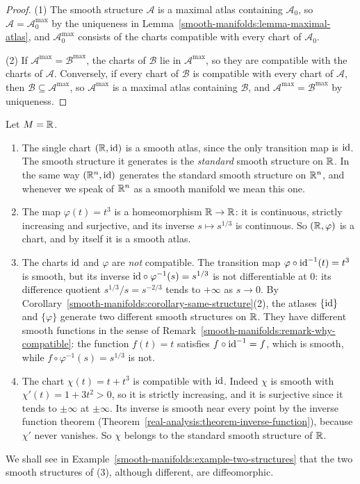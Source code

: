 \begin{proof}
(1) The smooth structure $\mathcal{A}$ is a maximal atlas containing $\mathcal{A}_0$, so $\mathcal{A} = \mathcal{A}_0^{\max}$ by the uniqueness in
Lemma~\ref{smooth-manifolds:lemma-maximal-atlas}, and $\mathcal{A}_0^{\max}$ consists of the charts compatible with every chart of $\mathcal{A}_0$.

(2) If $\mathcal{A}^{\max} = \mathcal{B}^{\max}$, the charts of $\mathcal{B}$ lie in $\mathcal{A}^{\max}$, so they are compatible with the charts of
$\mathcal{A}$. Conversely, if every chart of $\mathcal{B}$ is compatible with every chart of $\mathcal{A}$, then $\mathcal{B} \subseteq \mathcal{A}^{\max}$,
so $\mathcal{A}^{\max}$ is a maximal atlas containing $\mathcal{B}$, and $\mathcal{A}^{\max} = \mathcal{B}^{\max}$ by uniqueness.
\end{proof}

\begin{example}\label{smooth-manifolds:example-atlases-line}
Let $M = \mathbb{R}$.
\begin{enumerate}
\item The single chart $(\mathbb{R}, \mathrm{id})$ is a smooth atlas, since the only transition map is $\mathrm{id}$. The smooth structure it generates is the \emph{standard} smooth
structure on $\mathbb{R}$. In the same way $(\mathbb{R}^n, \mathrm{id})$ generates the standard smooth structure on $\mathbb{R}^n$, and whenever we speak of $\mathbb{R}^n$ as a smooth manifold we
mean this one.
\item The map $\varphi(t) = t^3$ is a homeomorphism $\mathbb{R} \to \mathbb{R}$: it is continuous, strictly increasing and surjective, and its inverse $s \mapsto s^{1/3}$ is
continuous. So $(\mathbb{R}, \varphi)$ is a chart, and by itself it is a smooth atlas.
\item The charts $\mathrm{id}$ and $\varphi$ are \emph{not} compatible. The transition map $\varphi \circ \mathrm{id}^{-1}(t) = t^3$ is smooth, but its inverse
$\mathrm{id} \circ \varphi^{-1}(s) = s^{1/3}$ is not differentiable at $0$: its difference quotient $s^{1/3}/s = s^{-2/3}$ tends to $+\infty$ as $s \to 0$. By
Corollary~\ref{smooth-manifolds:corollary-same-structure}(2), the atlases $\{\mathrm{id}\}$ and $\{\varphi\}$ generate two different smooth structures on $\mathbb{R}$. They
have different smooth functions in the sense of Remark~\ref{smooth-manifolds:remark-why-compatible}: the function $f(t) = t$ satisfies
$f \circ \mathrm{id}^{-1} = f$, which is smooth, while $f \circ \varphi^{-1}(s) = s^{1/3}$ is not.
\item The chart $\chi(t) = t + t^3$ is compatible with $\mathrm{id}$. Indeed $\chi$ is smooth with $\chi'(t) = 1 + 3t^2 > 0$, so it is strictly increasing, and it is
surjective since it tends to $\pm\infty$ at $\pm\infty$. Its inverse is smooth near every point by the inverse function theorem
(Theorem~\ref{real-analysis:theorem-inverse-function}), because $\chi'$ never vanishes. So $\chi$ belongs to the standard smooth structure of $\mathbb{R}$.
\end{enumerate}
We shall see in Example~\ref{smooth-manifolds:example-two-structures} that the two smooth structures of (3), although different, are diffeomorphic.
\end{example}

